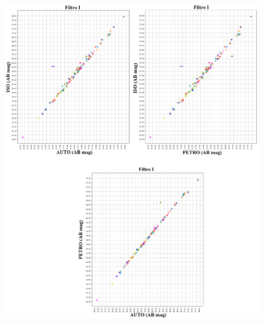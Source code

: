 \begin{anexosenv}
    \begin{figure}[h]
        \centering
        \includegraphics[width=1.0\textwidth]{Imagens/i_iso_auto.png}
        \caption[]{}
        \label{fig:i_iso_auto} 
    \end{figure}


\end{anexosenv}
